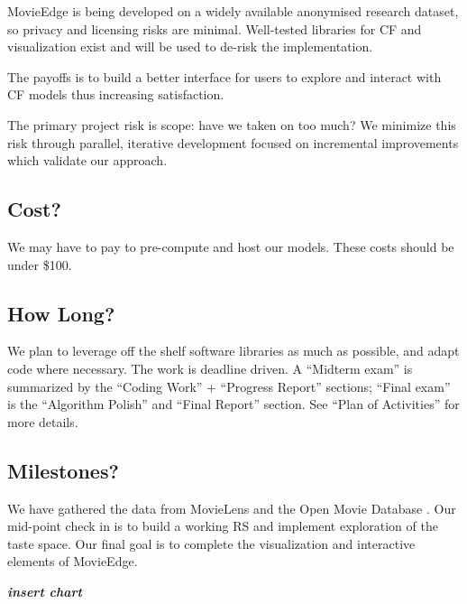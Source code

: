 MovieEdge is being developed on a widely available anonymised research dataset, so privacy and licensing risks are minimal. Well-tested libraries for CF and visualization exist and will be used to de-risk the implementation. 

The payoffs is to build a better interface for users to explore and interact with CF models thus increasing satisfaction. 

The primary project risk is scope: have we taken on too much?   We minimize this risk through parallel, iterative development focused on  incremental improvements which validate our approach.

\subsection{Cost?}
We may have to pay to pre-compute and host our models. These costs should be under \$100.

\subsection{How Long?}
We plan to leverage off the shelf software libraries as much as possible, and adapt code where necessary. The work is deadline driven.  A “Midterm exam” is summarized by the “Coding Work” + “Progress Report” sections; “Final exam” is the “Algorithm Polish” and “Final Report” section.  See “Plan of Activities” for more details.

\subsection{Milestones?}
We have gathered the data from MovieLens \cite{harper2016movielens} and the Open Movie Database \cite{openMovieDB}. Our mid-point check in is to build a working RS and implement exploration of the taste space. Our final goal is to complete the visualization and interactive elements of MovieEdge.


\textbf{\textit{insert chart}}



